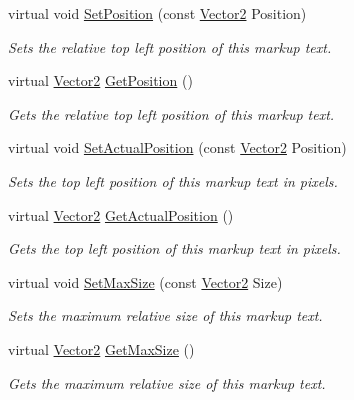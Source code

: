 \begin{DoxyCompactItemize}
virtual void \hyperlink{classphys_1_1UI_1_1MarkupText_aa4a71db4811506968086105e3126731c}{SetPosition} (const \hyperlink{classphys_1_1Vector2}{Vector2} Position)
\begin{DoxyCompactList}\small\item\em Sets the relative top left position of this markup text. \item\end{DoxyCompactList}\item 
virtual \hyperlink{classphys_1_1Vector2}{Vector2} \hyperlink{classphys_1_1UI_1_1MarkupText_a9d92f03e1cad181a5d8f20f3f95cf7cc}{GetPosition} ()
\begin{DoxyCompactList}\small\item\em Gets the relative top left position of this markup text. \item\end{DoxyCompactList}\item 
virtual void \hyperlink{classphys_1_1UI_1_1MarkupText_a0b6e052e1b592b66bc7fd923f975b7ef}{SetActualPosition} (const \hyperlink{classphys_1_1Vector2}{Vector2} Position)
\begin{DoxyCompactList}\small\item\em Sets the top left position of this markup text in pixels. \item\end{DoxyCompactList}\item 
virtual \hyperlink{classphys_1_1Vector2}{Vector2} \hyperlink{classphys_1_1UI_1_1MarkupText_a1e5bfba8d1686cb4188793fd695c7090}{GetActualPosition} ()
\begin{DoxyCompactList}\small\item\em Gets the top left position of this markup text in pixels. \item\end{DoxyCompactList}\item 
virtual void \hyperlink{classphys_1_1UI_1_1MarkupText_af8dd68edd25e9553fe559ad46852cd71}{SetMaxSize} (const \hyperlink{classphys_1_1Vector2}{Vector2} Size)
\begin{DoxyCompactList}\small\item\em Sets the maximum relative size of this markup text. \item\end{DoxyCompactList}\item 
virtual \hyperlink{classphys_1_1Vector2}{Vector2} \hyperlink{classphys_1_1UI_1_1MarkupText_ae68fd261f2dc9494a16e3089c7a35b8a}{GetMaxSize} ()
\begin{DoxyCompactList}\small\item\em Gets the maximum relative size of this markup text. \item\end{DoxyCompactList}\item 

\end{DoxyCompactItemize}
